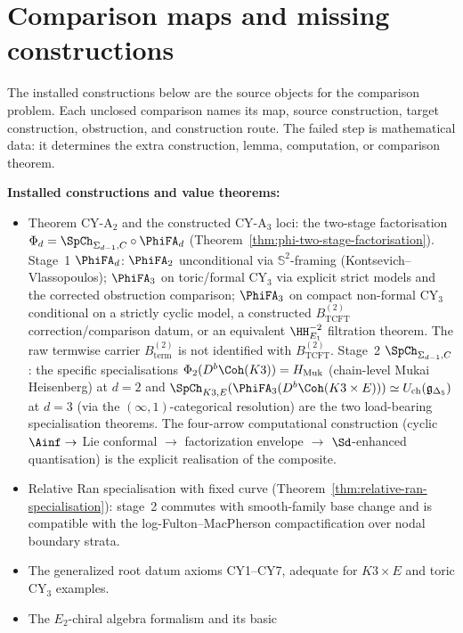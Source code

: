\section{Comparison maps and missing constructions}
\label{sec:proved-vs-conjectural}

The installed constructions below are the source objects for the
comparison problem. Each unclosed comparison names its map, source
construction, target construction, obstruction, and construction route.
The failed step is mathematical data: it determines the extra
construction, lemma, computation, or comparison theorem.

\noindent\textbf{Installed constructions and value theorems:}
\begin{itemize}[leftmargin=1.5em,topsep=0.3ex,itemsep=0.2ex]
 \item Theorem CY-A$_2$ and the constructed CY-A$_3$ loci: the two-stage
 factorisation
 $\Phi_d = \SpCh_{\Sigma_{d-1}, C} \circ \PhiFA_d$
 (Theorem~\ref{thm:phi-two-stage-factorisation}). Stage~1
 $\PhiFA_d$: $\PhiFA_2$ unconditional via
 $\mathbb{S}^2$-framing (Kontsevich--Vlassopoulos);
 $\PhiFA_3$ on toric/formal CY$_3$ via explicit strict models and
 the corrected obstruction comparison; $\PhiFA_3$ on compact
 non-formal CY$_3$ conditional on a strictly cyclic model, a
 constructed $B^{(2)}_{\mathrm{TCFT}}$ correction/comparison datum,
 or an equivalent $\HH^{-2}_{E_1}$ filtration theorem. The raw
 termwise carrier $B^{(2)}_{\mathrm{term}}$ is not identified with
 $B^{(2)}_{\mathrm{TCFT}}$. Stage~2
 $\SpCh_{\Sigma_{d-1}, C}$: the specific specialisations
 $\Phi_2(D^b\Coh(K3)) = H_{\mathrm{Muk}}$ (chain-level Mukai
 Heisenberg) at $d = 2$ and
 $\SpCh_{K3, E}(\PhiFA_3(D^b\Coh(K3 \times E)))
 \simeq U_{\mathrm{ch}}(\mathfrak{g}_{\Delta_5})$ at $d = 3$
 (via the $(\infty, 1)$-categorical resolution) are the two
 load-bearing specialisation theorems. The four-arrow
 computational construction (cyclic $\Ainf \to$ Lie conformal
 $\to$ factorization envelope $\to$ $\Sd$-enhanced
 quantisation) is the explicit realisation of the composite.
 \item Relative Ran specialisation with fixed curve
 (Theorem~\ref{thm:relative-ran-specialisation}): stage~2 commutes
 with smooth-family base change and is compatible with the
 log-Fulton--MacPherson compactification over nodal boundary strata.
 \item The generalized root datum axioms CY1--CY7, adequate
 for $K3 \times E$ and toric CY$_3$ examples.
 \item The $E_2$-chiral algebra formalism and its basic

\end{itemize}
